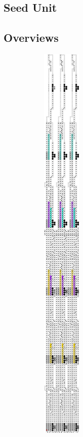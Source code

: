 \subsection{Seed Unit}

\subsection{Overviews}

        \begin{figure}[H]
            \centering
            \begin{subfigure}[t]{0.2\textwidth}
                \centering
                \includegraphics[width=0.2\textwidth]{full_overview_case3_colored}

\end{subfigure}
\end{figure}
